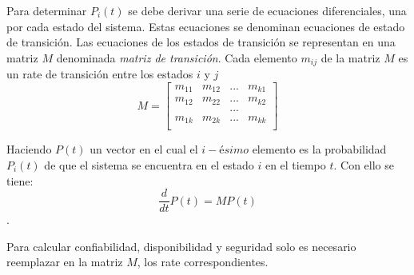 Para determinar $P_i(t)$ se debe derivar una serie de ecuaciones diferenciales, una por cada estado del sistema. Estas ecuaciones se denominan ecuaciones de estado de transición. Las ecuaciones de los estados de transición se representan en una matriz $M$ denominada \textit{matriz de transición}. Cada elemento $m_{ij}$ de la matriz $M$ es un rate de transición entre los estados $i$ y $j$
$$M = \left [
\begin{matrix}
  m_{11}  & m_{12}  & ... & m_{k1} \\
  m_{12}  & m_{22}  & ... & m_{k2} \\
          &         & ... &        \\
  m_{1k}  & m_{2k}  & ... & m_{kk} \\
\end{matrix}
\right ]
$$

Haciendo $P(t)$ un vector en el cual el $i-ésimo$ elemento es la probabilidad $P_i(t)$ de que el sistema se encuentra en el estado $i$ en el tiempo $t$. Con ello se tiene: $$\frac{d}{dt}P(t) = MP(t)$$ \citep{FTDesign}.

Para calcular confiabilidad, disponibilidad y seguridad solo es necesario reemplazar en la matriz $M$, los rate correspondientes.
